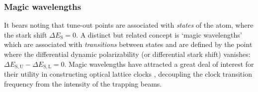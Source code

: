 


\subsubsection{Magic wavelengths}
	It bears noting that tune-out points are associated with \emph{states} of the atom, where the stark shift $\Delta E_\mathrm{S} =0$.
	A distinct but related concept is `magic wavelengths' which are associated with \emph{transitions} between states and are defined by the point where the differential dynamic polarizability (or differential stark shift) vanishes: $\Delta E_\mathrm{S,U}-\Delta E_\mathrm{S,L} = 0$. 
	Magic wavelengths have attracted a great deal of interest for their utility in constructing optical lattice clocks \cite{Takamoto05,Derevianko11}, decoupling the clock transition frequency from the intensity of the trapping beams.
